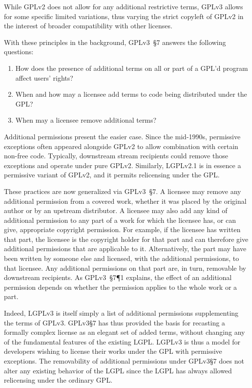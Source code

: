 
While GPLv2 does not allow for any additional restrictive terms, GPLv3 allows
for some specific limited variations, thus varying the strict copyleft of
GPLv2 in the interest of broader compatibility with other licenses.

With these principles in the background, GPLv3~\S7  answers the following
questions: 
\begin{enumerate}
\item How does the presence of additional terms on all or part of a GPL'd program
affect users' rights?

\item When and how may a licensee add terms to code being
distributed under the GPL? 

\item When may a licensee remove additional terms?
\end{enumerate}

Additional permissions present the easier case.  Since the mid-1990s,
permissive exceptions often appeared alongside GPLv2 to allow combination
with certain non-free code.  Typically, downstream
stream recipients could remove those exceptions and operate under pure GPLv2.
Similarly, LGPLv2.1 is in essence a permissive variant of GPLv2,
and it permits relicensing under the GPL\@.  

These practices are now generalized via GPLv3~\S7.
A licensee may remove any additional permission from
a covered work, whether it was placed by the original author or by an
upstream distributor.  A licensee may also add any kind of additional
permission to any part of a work for which the licensee has, or can give,
appropriate copyright permission. For example, if the licensee has written
that part, the licensee is the copyright holder for that part and can
therefore give additional permissions that are applicable to it.
Alternatively, the part may have been written by someone else and licensed,
with the additional permissions, to that licensee.  Any additional
permissions on that part are, in turn, removable by downstream recipients.
As GPLv3~\S7\P1 explains, the effect of an additional permission depends on
whether the permission applies to the whole work or a part.


Indeed, LGPLv3 is itself simply  a list of additional permissions supplementing the
terms of GPLv3.  GPLv3\S7 has thus provided the basis for recasting a
formally complex license as an elegant set of added terms, without changing
any of the fundamental features of the existing LGPL\@.  LGPLv3 is thus  a model for developers wishing to license their works under the
GPL with permissive exceptions.  The removability of additional permissions
under GPLv3\S7 does not alter any existing behavior of the LGPL since the LGPL
has always allowed relicensing under the ordinary GPL\@.

